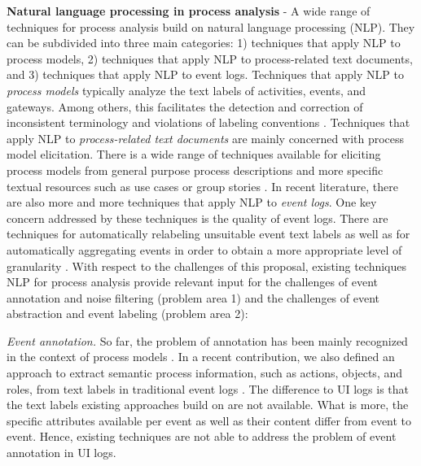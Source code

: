 \noindent{}

\textbf{Natural language processing in process analysis} - A wide range of techniques for process analysis build on natural language processing (NLP). They can be subdivided into three main categories: 1) techniques that apply NLP to process models, 2) techniques that apply NLP to process-related text documents, and 3) techniques that apply NLP to event logs. Techniques that apply NLP to \textit{process models} typically analyze the text labels of activities, events, and gateways. Among others, this facilitates the detection and correction of inconsistent terminology \cite{koschmider2007user,pittke2015automatic} and violations of labeling conventions \cite{becker2009towards,leopold2013detection}. Techniques that apply NLP to \textit{process-related text documents} are mainly concerned with process model elicitation. There is a wide range of techniques available for eliciting process models from general purpose process descriptions \cite{ghose2007process,friedrich2011process,epure2015automatic} and more specific textual resources such as use cases \cite{sinha2010use} or group stories  \cite{de2009business}. In recent literature, there are also more and more techniques that apply NLP to \textit{event logs}. One key concern addressed by these techniques is the quality of event logs. There are techniques for automatically relabeling unsuitable event text labels \cite{ramos2021nlp} as well as for automatically aggregating events in order to obtain a more appropriate level of granularity \cite{deokar2015semantics}. With respect to the challenges of this proposal, existing techniques NLP for process analysis provide relevant input for the challenges of event annotation and noise filtering (problem area 1) and the challenges of event abstraction and event labeling (problem area 2): 

\textit{Event annotation.} So far, the problem of annotation has been mainly recognized in the context of process models \cite{leopold2013detection}. In a recent contribution, we also defined an approach to extract semantic process information, such as actions, objects, and roles, from text labels in traditional event logs \cite{rebmann2021extracting}. The difference to UI logs is that the text labels existing approaches build on are not available. What is more, the specific attributes available per event as well as their content differ from event to event. Hence, existing techniques are not able to address the problem of event annotation in UI logs. 

